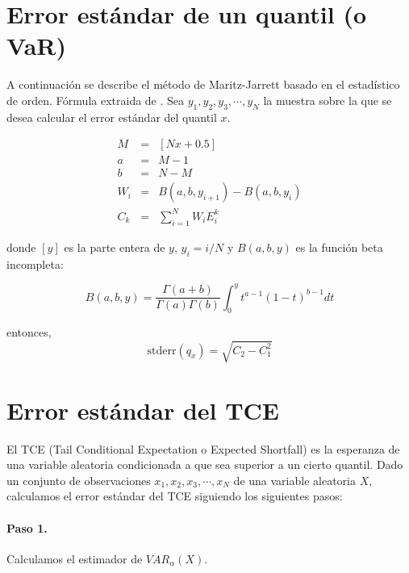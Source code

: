 
\section{Error est\'andar de un quantil (o VaR)}
\label{apendix:stderrvar}

A continuaci\'on se describe el m\'etodo de Maritz-Jarrett basado en el
estad\'istico de orden. F\'ormula extraida de \cite{quant:algor}. Sea
$y_1, y_2, y_3, \cdots, y_N$ la muestra sobre la que se desea calcular 
el error est\'andar del quantil $x$.

\begin{eqnarray}
M   & = & [Nx + 0.5] \nonumber \\
a   & = & M - 1 \nonumber \\
b   & = & N - M \nonumber \\
W_i & = & B(a,b,y_{i+1}) - B(a,b,y_i) \nonumber \\
C_k & = & \sum_{i=1}^{N} W_i E_i^k \nonumber
\end{eqnarray}

donde $[y]$ es la parte entera de $y$, $y_i=i/N$ y $B(a,b,y)$ es la funci\'on
beta incompleta:

\begin{displaymath}
B(a,b,y)=\frac{\Gamma(a+b)}{\Gamma(a)\Gamma(b)}\int_0^y t^{a-1} (1-t)^{b-1} dt
\end{displaymath}

entonces,
\begin{displaymath}
\textrm{stderr}(q_x) = \sqrt{C_2 - C_1^2}
\end{displaymath}


\section{Error est\'andar del TCE}
\label{apendix:stderrtce}

El TCE (Tail Conditional Expectation o Expected Shortfall) es la esperanza
de una variable aleatoria condicionada a que sea superior a un cierto quantil.
Dado un conjunto de observaciones $x_1, x_2, x_3, \cdots, x_N$ de una variable
aleatoria $X$, calculamos el error est\'andar del TCE siguiendo los siguientes
pasos:

\paragraph{Paso 1.} Calculamos el estimador de $VAR_{\alpha}(X)$.

